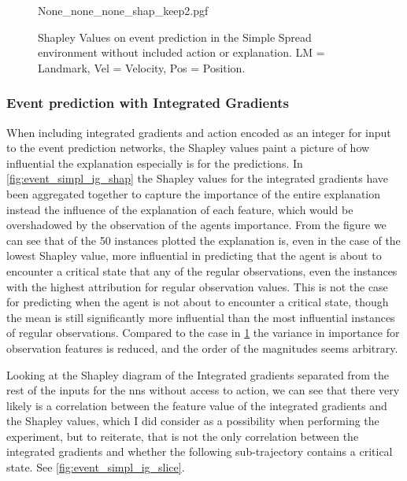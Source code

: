 \documentclass[UKenglish]{uiomasterthesis}
\begin{document}
\begin{figure}[H]
\centering
{None_none_none_shap_keep2.pgf}
\caption{Shapley Values on event prediction in the Simple Spread environment without included action or explanation. LM = Landmark, Vel = Velocity, Pos = Position.}
\label{fig:event_simpl_shap}
\end{figure}

\subsubsection{Event prediction with Integrated Gradients}
When including integrated gradients and action encoded as an integer for input to the event prediction networks, the Shapley values paint a picture of how influential the explanation especially is for the predictions. In \cref{fig:event_simpl_ig_shap} the Shapley values for the integrated gradients have been aggregated together to capture the importance of the entire explanation instead the influence of the explanation of each feature, which would be overshadowed by the observation of the agents importance. From the figure we can see that of the 50 instances plotted the explanation is, even in the case of the lowest Shapley value, more influential in predicting that the agent is about to encounter a critical state that any of the regular observations, even the instances with the highest attribution for regular observation values. This is not the case for predicting when the agent is not about to encounter a critical state, though the mean is still significantly more influential than the most influential instances of regular observations. Compared to the case in \cref{fig:event_simpl_shap} the variance in importance for observation features is reduced, and the order of the magnitudes seems arbitrary.

Looking at the Shapley diagram of the Integrated gradients separated from the rest of the inputs for the \acp{nn} without access to action, we can see that there very likely is a correlation between the feature value of the integrated gradients and the Shapley values, which I did consider as a possibility when performing the experiment, but to reiterate, that is not the only correlation between the integrated gradients and whether the following sub-trajectory contains a critical state. See \cref{fig:event_simpl_ig_slice}.
\end{document}
